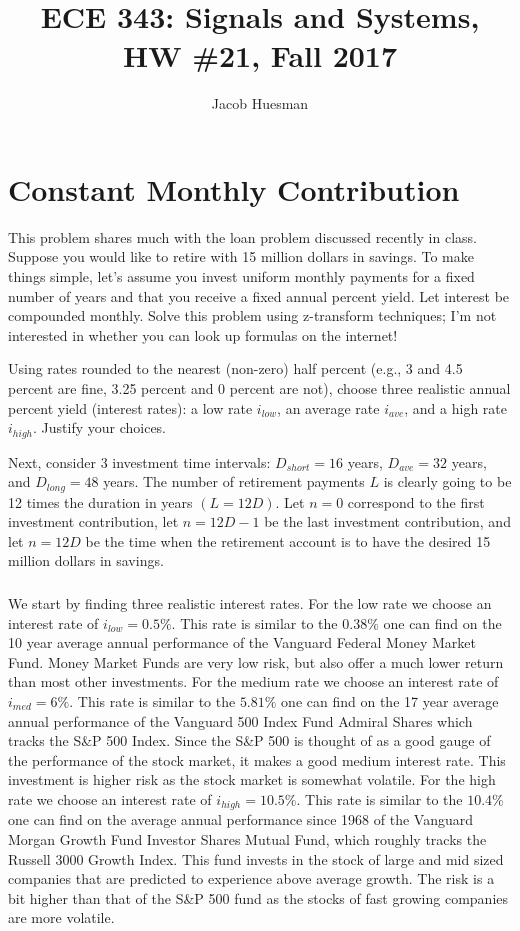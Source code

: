 \documentclass[letterpaper]{report}
\author{Jacob Huesman}
\title{ECE 343: Signals and Systems, HW \#21, Fall 2017}
\begin{document}
\maketitle


\section{Constant Monthly Contribution}
This problem shares much with the loan problem discussed recently in class. Suppose you would like to retire with 15 million dollars in savings. To make things simple, let’s assume you invest uniform monthly payments for a fixed number of years and that you receive a fixed annual percent yield. Let interest be compounded monthly. Solve this problem using z-transform techniques; I’m not interested in whether you can look up formulas on the internet! 

Using rates rounded to the nearest (non-zero) half percent (e.g., 3 and 4.5 percent are fine, 3.25 percent and 0 percent are not), choose three realistic annual percent yield (interest rates): a low rate $i_{low}$, an average rate $i_{ave}$, and a high rate $i_{high}$. Justify your choices.

Next, consider 3 investment time intervals: $D_{short} = 16$ years, $D_{ave} = 32$ years, and $D_{long} = 48$ years. The number of retirement payments $L$ is clearly going to be 12 times the duration in years $(L = 12D)$. Let $n = 0$ correspond to the first investment contribution, let $n=12D - 1$ be the last investment contribution, and let $n = 12D$ be the time when the retirement account is to have the desired 15 million dollars in savings.

\subsubsection{}
We start by finding three realistic interest rates. For the low rate we choose an interest rate of $i_{low}=0.5\%$. This rate is similar to the $0.38\%$ one can find on the 10 year average annual performance of the Vanguard Federal Money Market Fund. Money Market Funds are very low risk, but also offer a much lower return than most other investments. For the medium rate we choose an interest rate of $i_{med}=6\%$. This rate is similar to the $5.81\%$ one can find on the 17 year average annual performance of the Vanguard 500 Index Fund Admiral Shares which tracks the S\&P 500 Index. Since the S\&P 500 is thought of as a good gauge of the performance of the stock market, it makes a good medium interest rate. This investment is higher risk as the stock market is somewhat volatile. For the high rate we choose an interest rate of $i_{high}=10.5\%$. This rate is similar to the $10.4\%$ one can find on the average annual performance since 1968 of the Vanguard Morgan Growth Fund Investor Shares Mutual Fund, which roughly tracks the Russell 3000 Growth Index. This fund invests in the stock of large and mid sized companies that are predicted to experience above average growth. The risk is a bit higher than that of the S\&P 500 fund as the stocks of fast growing companies are more volatile.
\end{document}
